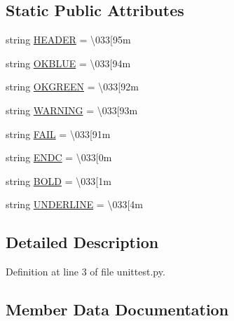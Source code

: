 \subsection*{Static Public Attributes}
\begin{DoxyCompactItemize}
\item 
string \hyperlink{classunittest_1_1bcolors_a0e8ae760e5f682550fc0b4e5638c47d0}{H\+E\+A\+D\+ER} = \textquotesingle{}\textbackslash{}033\mbox{[}95m\textquotesingle{}
\item 
string \hyperlink{classunittest_1_1bcolors_ac76b755140eefd1ff1eda35552b9ea01}{O\+K\+B\+L\+UE} = \textquotesingle{}\textbackslash{}033\mbox{[}94m\textquotesingle{}
\item 
string \hyperlink{classunittest_1_1bcolors_a4ea0a9b856e4906b0423ae6ae4ac16c8}{O\+K\+G\+R\+E\+EN} = \textquotesingle{}\textbackslash{}033\mbox{[}92m\textquotesingle{}
\item 
string \hyperlink{classunittest_1_1bcolors_acc0c1f9b572e877f80e4017094d3de68}{W\+A\+R\+N\+I\+NG} = \textquotesingle{}\textbackslash{}033\mbox{[}93m\textquotesingle{}
\item 
string \hyperlink{classunittest_1_1bcolors_a2dada3141c1e833e5a3cacd4f39dcf47}{F\+A\+IL} = \textquotesingle{}\textbackslash{}033\mbox{[}91m\textquotesingle{}
\item 
string \hyperlink{classunittest_1_1bcolors_a5db993c726eedb06b4a7efab09551f4e}{E\+N\+DC} = \textquotesingle{}\textbackslash{}033\mbox{[}0m\textquotesingle{}
\item 
string \hyperlink{classunittest_1_1bcolors_a95b491580216e848b313b0918ccea7ea}{B\+O\+LD} = \textquotesingle{}\textbackslash{}033\mbox{[}1m\textquotesingle{}
\item 
string \hyperlink{classunittest_1_1bcolors_ac181b1324b4847e254b738c74ef5fc00}{U\+N\+D\+E\+R\+L\+I\+NE} = \textquotesingle{}\textbackslash{}033\mbox{[}4m\textquotesingle{}
\end{DoxyCompactItemize}


\subsection{Detailed Description}


Definition at line 3 of file unittest.\+py.



\subsection{Member Data Documentation}
